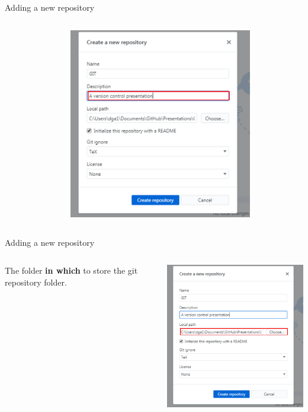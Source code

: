 \documentclass[10pt]{beamer}
\begin{document}
{\begin{frame}[fragile]{Adding a new repository}
\begin{columns}[T]
\begin{column}{.2\textwidth}
\end{column}
\begin{column}{.8\textwidth}
\includegraphics[width=8cm]{Figs/GHD/new_repo_02}
\end{column}
\end{columns}
\end{frame}

\begin{frame}[fragile]{Adding a new repository}
\begin{columns}[T]
\begin{column}{.2\textwidth}
\small The folder \textbf{in which} to store the git repository folder.
\end{column}
\begin{column}{.8\textwidth}
\includegraphics[width=8cm]{Figs/GHD/new_repo_03}
\end{column}
\end{columns}
\end{frame}

}
\end{document}
